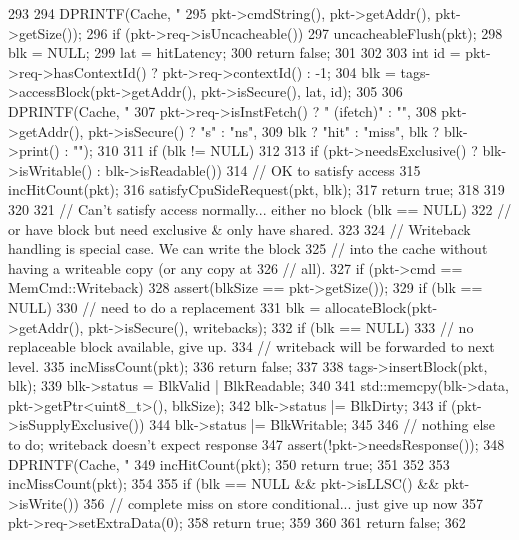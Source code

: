 \begin{DoxyCode}
293 {
294     DPRINTF(Cache, "%
295             pkt->cmdString(), pkt->getAddr(), pkt->getSize());
296     if (pkt->req->isUncacheable()) {
297         uncacheableFlush(pkt);
298         blk = NULL;
299         lat = hitLatency;
300         return false;
301     }
302 
303     int id = pkt->req->hasContextId() ? pkt->req->contextId() : -1;
304     blk = tags->accessBlock(pkt->getAddr(), pkt->isSecure(), lat, id);
305 
306     DPRINTF(Cache, "%
307             pkt->req->isInstFetch() ? " (ifetch)" : "",
308             pkt->getAddr(), pkt->isSecure() ? "s" : "ns",
309             blk ? "hit" : "miss", blk ? blk->print() : "");
310 
311     if (blk != NULL) {
312 
313         if (pkt->needsExclusive() ? blk->isWritable() : blk->isReadable()) {
314             // OK to satisfy access
315             incHitCount(pkt);
316             satisfyCpuSideRequest(pkt, blk);
317             return true;
318         }
319     }
320 
321     // Can't satisfy access normally... either no block (blk == NULL)
322     // or have block but need exclusive & only have shared.
323 
324     // Writeback handling is special case.  We can write the block
325     // into the cache without having a writeable copy (or any copy at
326     // all).
327     if (pkt->cmd == MemCmd::Writeback) {
328         assert(blkSize == pkt->getSize());
329         if (blk == NULL) {
330             // need to do a replacement
331             blk = allocateBlock(pkt->getAddr(), pkt->isSecure(), writebacks);
332             if (blk == NULL) {
333                 // no replaceable block available, give up.
334                 // writeback will be forwarded to next level.
335                 incMissCount(pkt);
336                 return false;
337             }
338             tags->insertBlock(pkt, blk);
339             blk->status = BlkValid | BlkReadable;
340         }
341         std::memcpy(blk->data, pkt->getPtr<uint8_t>(), blkSize);
342         blk->status |= BlkDirty;
343         if (pkt->isSupplyExclusive()) {
344             blk->status |= BlkWritable;
345         }
346         // nothing else to do; writeback doesn't expect response
347         assert(!pkt->needsResponse());
348         DPRINTF(Cache, "%
349         incHitCount(pkt);
350         return true;
351     }
352 
353     incMissCount(pkt);
354 
355     if (blk == NULL && pkt->isLLSC() && pkt->isWrite()) {
356         // complete miss on store conditional... just give up now
357         pkt->req->setExtraData(0);
358         return true;
359     }
360 
361     return false;
362 }
\end{DoxyCode}
